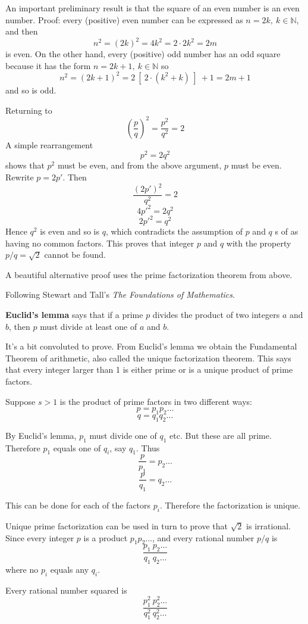 \documentclass[11pt, oneside]{article}   	%
\begin{document}
An important preliminary result is that the square of an even number is an even number.  Proof:  every (positive) even number can be expressed as $n = 2k, \ k \in \mathbb{N}$, and then
\[ n^2 = (2k)^2 = 4k^2 = 2 \cdot 2 k^2 = 2m \]
is even.  On the other hand, every (positive) odd number has an odd square because it has the form $n = 2k + 1, \ k \in \mathbb{N}$ so
\[ n^2 = (2k + 1)^2 = 2 \ [ \ 2 \cdot (k^2 + k) \ ] \  + 1 = 2m + 1 \]
and so is odd.

Returning to
\[ (\frac{p}{q})^2 = \frac{p^2}{q^2} = 2 \]
A simple rearrangement 
\[ p^2 = 2 q^2 \]
shows that $p^2$ must be even, and from the above argument, $p$ must be even.  Rewrite $p = 2p'$.  Then
\[ \frac{(2p')^2}{q^2} = 2 \]
\[ 4 p'^2 = 2 q^2 \]
\[ 2 p'^2 = q^2 \]
Hence $q^2$ is even and so is $q$, which contradicts the assumption of $p$ and $q$ s of as having no common factors.  This proves that integer $p$ and $q$ with the property $p/q = \sqrt{2}$ cannot be found.

A beautiful alternative proof uses the prime factorization theorem from above.  

Following Stewart and Tall's \emph{The Foundations of Mathematics}.

\textbf{Euclid's lemma} says that if a prime $p$ divides the product of two integers $a$ and $b$, then $p$ must divide at least one of $a$ and $b$.

It's a bit convoluted to prove.  From Euclid's lemma we obtain the Fundamental Theorem of arithmetic, also called the unique factorization theorem.  This says that every integer larger than 1 is either prime or is a unique product of prime factors.

Suppose $s > 1$ is the product of prime factors in two different ways:
\[ p = p_1 p_2 \dots \]
\[ q = q_1 q_2 \dots \]

By Euclid's lemma, $p_1$ must divide one of $q_1$ etc.  But these are all prime.  Therefore $p_1$ equals one of $q_i$, say $q_1$.  Thus
\[ \frac{p}{p_1} = p_2 \dots \]
\[ \frac{p}{q_1} = q_2 \dots \]

This can be done for each of the factors $p_i$.  Therefore the factorization is unique.

Unique prime factorization can be used in turn to prove that $\sqrt{2}$ is irrational.  Since every integer $p$ is a product $p_1 p_2 \dots$, and every rational number $p/q$ is
\[ \frac{p_1 \ p_2 \dots}{q_1 \ q_2 \dots} \]
where no $p_i$ equals any $q_i$.

Every rational number squared is 
\[ \frac{p_1^2 \ p_2^2 \dots}{q_1^2 \ q_2^2 \dots} \]
\end{document}
